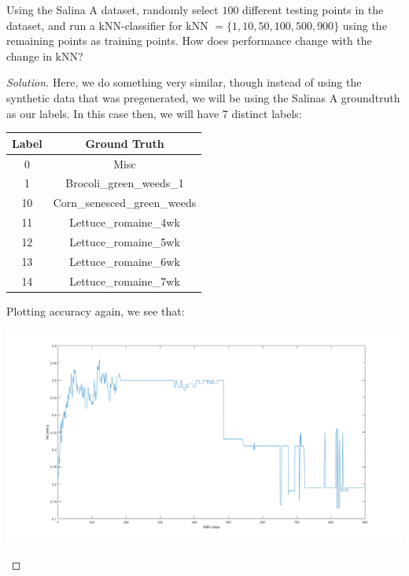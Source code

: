 \documentclass[10pt]{article}
\newenvironment{problem}[2][]{\begin{trivlist}
\item[\hskip \labelsep {\bfseries #1}\hskip \labelsep {\bfseries #2.}]}{\end{trivlist}}
\begin{document}
\begin{problem}{Question 4}

Using the Salina A dataset, randomly select $100$ different testing points in the dataset, and run a kNN-classifier for kNN $= \{ 1,10,50,100,500,900 \}$ using the remaining points as training points. How does performance change with the change in kNN?


\end{problem}

\begin{proof}[Solution]

Here, we do something very similar, though instead of using the synthetic data that was pregenerated, we will be using the Salinas A groundtruth as our labels. In this case then, we will have 7 distinct labels:

\begin{center}
\begin{tabular}{|| c| c||}
\hline
Label & Ground Truth \\

\hline \hline
0 & Misc \\ \hline
1 & Brocoli\_green\_weeds\_1 \\ \hline
10 & Corn\_senesced\_green\_weeds \\ \hline
11 & Lettuce\_romaine\_4wk \\ \hline
12 & Lettuce\_romaine\_5wk \\ \hline
13 &  Lettuce\_romaine\_6wk \\ \hline
14 & Lettuce\_romaine\_7wk \\ \hline
\end{tabular}
\end{center}

Plotting accuracy again, we see that:

\begin{center}
\includegraphics[width=\linewidth]{knn_salinas_accuracy}
\end{center}


\end{proof}
\end{document}
